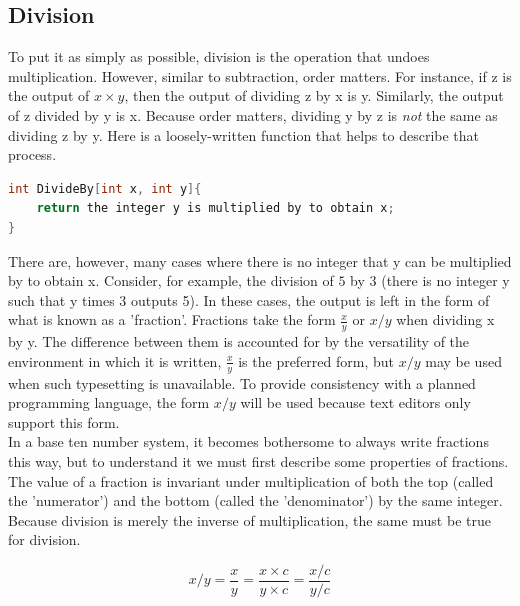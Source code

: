 \subsection{Division}
To put it as simply as possible, division is the operation that undoes multiplication. However, similar to subtraction, order matters. For instance, if z is the output of $x\times y$, then the output of dividing z by x is y. Similarly, the output of z divided by y is x. Because order matters, dividing y by z is \emph{not} the same as dividing z by y. Here is a loosely-written function that helps to describe that process.
\begin{center}
\begin{lstlisting}[language=C,caption=Division Function,label=lst:divFunc]
int DivideBy[int x, int y]{
	return the integer y is multiplied by to obtain x;
}
\end{lstlisting}
\end{center}
There are, however, many cases where there is no integer that y can be multiplied by to obtain x. Consider, for example, the division of $5$ by $3$ (there is no integer y such that y times 3 outputs 5). In these cases, the output is left in the form of what is known as a 'fraction'. Fractions take the form $\frac{x}{y}$ or $x/y$ when dividing x by y. The difference between them is accounted for by the versatility of the environment in which it is written, $\frac{x}{y}$ is the preferred form, but $x/y$ may be used when such typesetting is unavailable. To provide consistency with a planned programming language, the form $x/y$ will be used because text editors only support this form. \\
In a base ten number system, it becomes bothersome to always write fractions this way, but to understand it we must first describe some properties of fractions. \\
The value of a fraction is invariant under multiplication of both the top (called the 'numerator') and the bottom (called the 'denominator') by the same integer. Because division is merely the inverse of multiplication, the same must be true for division.
\begin{center}
\begin{equation}
x / y = \frac{x}{y} = \frac{x\times c}{y \times c} = \frac{x / c}{y / c}
\end{equation}
\end{center}
























